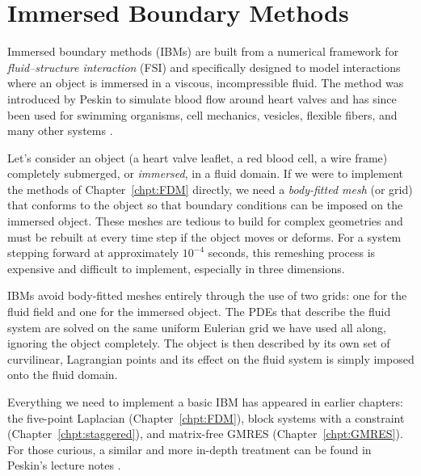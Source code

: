 \chapter{Immersed Boundary Methods}
\label{chpt:IBM}

\providecommand{\IBfigplaceholder}[1]{%
  \fbox{\parbox[c][#1][c]{0.85\textwidth}{\centering\sffamily\small
  \textbf{[Figure to be added]}}}}

Immersed boundary methods (IBMs) are built from a numerical framework for
\emph{fluid--structure interaction} (FSI) and specifically designed to model interactions where an object is immersed in a viscous, incompressible fluid. The method was introduced by Peskin to
simulate blood flow around heart valves \parencite{peskin1972} and has
since been used for swimming organisms, cell mechanics, vesicles, flexible
fibers, and many other systems \parencite{peskin2002, mittalIaccarino2005}.

Let's consider an object (a heart valve leaflet, a red blood cell, a wire frame) completely
submerged, or \textit{immersed}, in a fluid domain. If we were to implement the methods of
Chapter~\ref{chpt:FDM} directly, we need a \textit{body-fitted mesh} (or grid) that conforms to the
object so that boundary conditions can be imposed on the immersed object. These meshes are tedious to build for complex geometries and must be rebuilt at every time step if the
object moves or deforms. For a system stepping forward at approximately $10^{-4}$ seconds, this remeshing process is expensive and difficult to implement, especially in three dimensions.

IBMs avoid body-fitted meshes entirely through the use of two grids: one for the fluid field and one for the immersed object. The PDEs that describe the fluid system are solved on the
same uniform Eulerian grid we have used all along, ignoring the object
completely. The object is then described by its own set of curvilinear, Lagrangian points and its
effect on the fluid system is simply imposed onto the fluid domain.

Everything we need to implement a basic IBM
has appeared in earlier chapters: the five-point Laplacian
(Chapter~\ref{chpt:FDM}), block systems with a constraint
(Chapter~\ref{chpt:staggered}), and matrix-free GMRES
(Chapter~\ref{chpt:GMRES}). For those curious, a similar and more in-depth treatment can be found in Peskin's
lecture notes \parencite{peskinNotes}.





